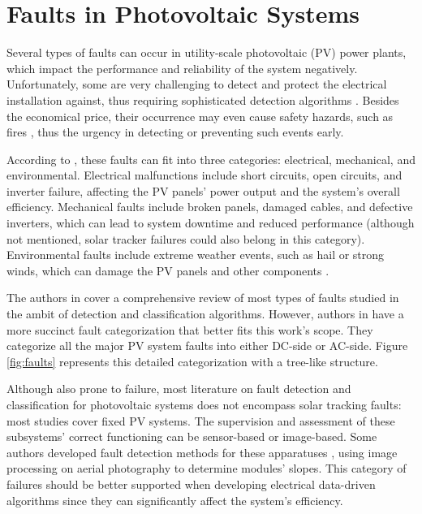 \section{Faults in Photovoltaic Systems}

Several types of faults can occur in utility-scale photovoltaic (PV) power plants, which impact the performance and reliability of the system negatively. Unfortunately, some are very challenging to detect and protect the electrical installation against, thus requiring sophisticated detection algorithms \cite{Pillai2018}. Besides the economical price, their occurrence may even cause safety hazards, such as fires \cite{Alam2015}, thus the urgency in detecting or preventing such events early.

According to \cite{Pillai2018}, these faults can fit into three categories: electrical, mechanical, and environmental. Electrical malfunctions include short circuits, open circuits, and inverter failure, affecting the PV panels' power output and the system's overall efficiency. Mechanical faults include broken panels, damaged cables, and defective inverters, which can lead to system downtime and reduced performance (although not mentioned, solar tracker failures could also belong in this category). Environmental faults include extreme weather events, such as hail or strong winds, which can damage the PV panels and other components \cite{faults}.

The authors in \cite{Hong2022} cover a comprehensive review of most types of faults studied in the ambit of detection and classification algorithms. However, authors in \cite{Livera2019} have a more succinct fault categorization that better fits this work's scope. They categorize all the major PV system faults into either DC-side or AC-side. Figure \ref{fig:faults} represents this detailed categorization with a tree-like structure.

Although also prone to failure, most literature on fault detection and classification for photovoltaic systems does not encompass solar tracking faults: most studies cover fixed PV systems. The supervision and assessment of these subsystems' correct functioning can be sensor-based \cite{Stepanov2014} or image-based. Some authors developed fault detection methods for these apparatuses \cite{Amaral2021}, using image processing on aerial photography to determine modules' slopes. This category of failures should be better supported when developing electrical data-driven algorithms since they can significantly affect the system's efficiency.


